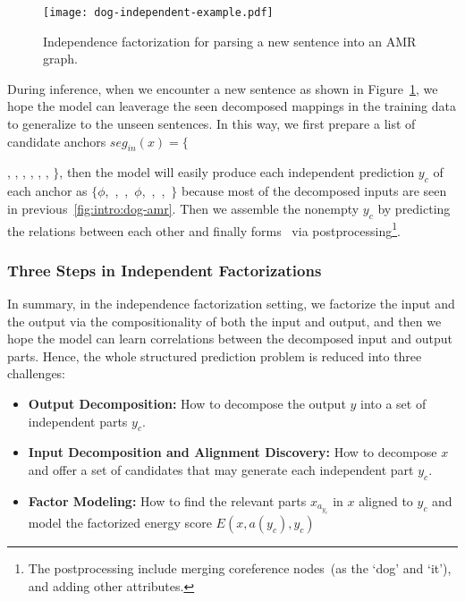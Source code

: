 \begin{figure}[!tbp]
\centering
\texttt{[image: dog-independent-example.pdf]}
\caption{\label{fig:intro:independent-example}Independence
  factorization for parsing a new sentence  into an AMR graph.}
\end{figure}

During inference, when we encounter a new sentence as shown in
Figure~\ref{fig:intro:independent-example}, we hope the model can
leaverage the seen decomposed mappings in the training data to
generalize to the unseen sentences. In this way, we first prepare a
list of candidate anchors $seg_{in}(x)=\{${,
  , , , ,
  , $\}$, then the model will easily produce
  each independent prediction $y_{c}$ of each anchor as
  $\{\phi$,~,~,~$\phi$,~,~,~$\}$
  because most of the decomposed inputs are seen in
  previous~\autoref{fig:intro:dog-amr}. Then we assemble the nonempty
  $y_{c}$ by predicting the relations between each other and finally
  forms \OUT~via postprocessing\footnote{The postprocessing include
    merging coreference nodes~(as the `dog' and `it'), and adding other
    attributes.}.

\subsubsection{Three Steps in Independent Factorizations}
\label{sssec:intro:steps-inductive-bias}
In summary, in the independence factorization setting, we factorize
the input and the output via the compositionality of both the input
and output, and then we hope the model can learn correlations between
the decomposed input and output parts. Hence, the whole structured
prediction problem is reduced into three challenges:

\begin{itemize}
\item \textbf{Output Decomposition:} How to decompose the output $y$
  into a set of independent parts $y_{c}$.

\item \textbf{Input Decomposition and Alignment Discovery:} How to decompose $x$ and offer a
  set of candidates that may generate each independent part $y_{c}$.
\item \textbf{Factor Modeling:} How to find the relevant parts
  $x_{a_{y_{c}}}$ in $x$ aligned to ${y_{c}}$ and model the factorized
  energy score $E(x, a(y_{c}), y_{c})$
\end{itemize}

}
